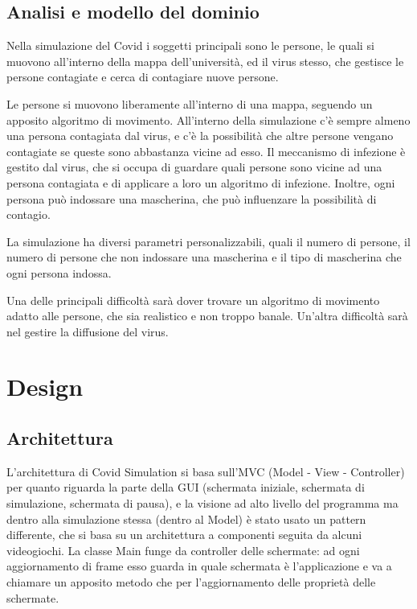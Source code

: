 \documentclass[a4paper,12pt]{report}
\begin{document}
\section{Analisi e modello del dominio}
Nella simulazione del Covid i soggetti principali sono le persone, le quali si muovono all'interno della mappa dell'università, ed il virus stesso, che gestisce le persone contagiate e cerca di contagiare nuove persone.

Le persone si muovono liberamente all'interno di una mappa, seguendo un apposito algoritmo di movimento. All'interno della simulazione c'è sempre almeno una persona contagiata dal virus, e c'è la possibilità che altre persone vengano contagiate se queste sono abbastanza vicine ad esso. Il meccanismo di infezione è gestito dal virus, che si occupa di guardare quali persone sono vicine ad una persona contagiata e di applicare a loro un algoritmo di infezione. Inoltre, ogni persona può indossare una mascherina, che può influenzare la possibilità di contagio.

La simulazione ha diversi parametri personalizzabili, quali il numero di persone, il numero di persone che non indossare una mascherina e il tipo di mascherina che ogni persona indossa.

Una delle principali difficoltà sarà dover trovare un algoritmo di movimento adatto alle persone, che sia realistico e non troppo banale. Un'altra difficoltà sarà nel gestire la diffusione del virus.

\chapter{Design}

\section{Architettura}

L'architettura di Covid Simulation si basa sull'MVC (Model - View - Controller) per quanto riguarda la parte della GUI (schermata iniziale, schermata di simulazione, schermata di pausa), e la visione ad alto livello del programma ma dentro alla simulazione stessa (dentro al Model) è stato usato un pattern differente, che si basa su un architettura a componenti seguita da alcuni videogiochi.
La classe Main funge da controller delle schermate: ad ogni aggiornamento di frame esso guarda in quale schermata è l'applicazione e va a chiamare un apposito metodo che per l'aggiornamento delle proprietà delle schermate.
\end{document}
